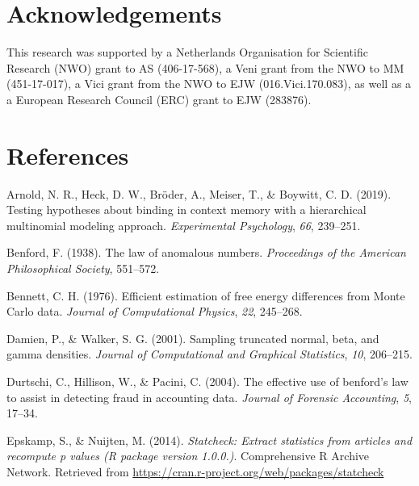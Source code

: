 \documentclass[
  english,
  man,floatsintext]{apa6}
\begin{document}
\hypertarget{acknowledgements}{%
\section{Acknowledgements}\label{acknowledgements}}

This research was supported by a Netherlands Organisation for Scientific Research (NWO) grant
to AS (406-17-568), a Veni grant from the NWO to MM (451-17-017), a Vici grant from the NWO to EJW (016.Vici.170.083), as well as a a European Research Council (ERC) grant to EJW (283876).

\clearpage

\hypertarget{references}{%
\section{References}\label{references}}

\begingroup
\setlength{\parindent}{-0.5in}
\setlength{\leftskip}{0.5in}

\hypertarget{refs}{}
\leavevmode\hypertarget{ref-arnold2019testing}{}%
Arnold, N. R., Heck, D. W., Bröder, A., Meiser, T., \& Boywitt, C. D. (2019). Testing hypotheses about binding in context memory with a hierarchical multinomial modeling approach. \emph{Experimental Psychology}, \emph{66}, 239--251.

\leavevmode\hypertarget{ref-benford1938law}{}%
Benford, F. (1938). The law of anomalous numbers. \emph{Proceedings of the American Philosophical Society}, 551--572.

\leavevmode\hypertarget{ref-bennett1976efficient}{}%
Bennett, C. H. (1976). Efficient estimation of free energy differences from Monte Carlo data. \emph{Journal of Computational Physics}, \emph{22}, 245--268.

\leavevmode\hypertarget{ref-damien2001sampling}{}%
Damien, P., \& Walker, S. G. (2001). Sampling truncated normal, beta, and gamma densities. \emph{Journal of Computational and Graphical Statistics}, \emph{10}, 206--215.

\leavevmode\hypertarget{ref-durtschi2004effective}{}%
Durtschi, C., Hillison, W., \& Pacini, C. (2004). The effective use of benford's law to assist in detecting fraud in accounting data. \emph{Journal of Forensic Accounting}, \emph{5}, 17--34.

\leavevmode\hypertarget{ref-epskamp2014statcheck}{}%
Epskamp, S., \& Nuijten, M. (2014). \emph{Statcheck: Extract statistics from articles and recompute p values (R package version 1.0.0.)}. Comprehensive R Archive Network. Retrieved from \url{https://cran.r-project.org/web/packages/statcheck}
\end{document}
